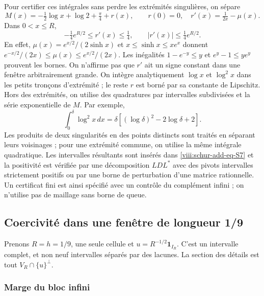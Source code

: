 Pour certifier ces intégrales sans perdre les extrémités singulières,
on sépare
\begin{equation}
M(x)=-\tfrac12\log x+\log2+\tfrac\pi4+r(x),
\qquad r(0)=0,\quad r'(x)=\tfrac1{2x}-\mu(x).
\label{viii:schur-add-eq-S8}
\end{equation}
Dans \(0<x\leq R\),
\begin{equation}
-\tfrac14 e^{R/2}\leq r'(x)\leq\tfrac14,
\qquad |r'(x)|\leq\tfrac14e^{R/2}.
\label{viii:schur-add-display-19}
\end{equation}
En effet, \(\mu(x)=e^{x/2}/(2\sinh x)\) et
\(x\leq\sinh x\leq xe^x\) donnent
\(e^{-x/2}/(2x)\leq\mu(x)\leq e^{x/2}/(2x)\).
Les inégalités \(1-e^{-y}\leq y\) et \(e^y-1\leq ye^y\)
prouvent les bornes. On n'affirme pas que \(r'\) ait un signe constant
dans une fenêtre arbitrairement grande.
On intègre analytiquement \(\log x\) et \(\log^2x\) dans les petits
tronçons d'extrémité ; le reste \(r\) est borné par sa constante de Lipschitz.
Hors des extrémités, on utilise des quadratures par intervalles subdivisées et
la série exponentielle de \(M\). Par exemple,
\begin{equation}
\int_0^\delta\log^2x\,dx
=\delta[(\log\delta)^2-2\log\delta+2].
\label{viii:schur-add-display-20}
\end{equation}
Les produits de deux singularités en des points distincts sont traités
en séparant leurs voisinages ; pour une extrémité commune, on utilise la même
intégrale quadratique. Les intervalles résultants sont insérés dans \eqref{viii:schur-add-eq-S7} et
la positivité est vérifiée par une décomposition \(LDL^*\) avec
des pivots intervalles strictement positifs ou par une borne de perturbation
d'une matrice rationnelle. Un certificat fini est ainsi spécifié
avec un contrôle du complément infini ; on n'utilise pas de maillage sans borne de queue.

\subsection{Coercivité dans une fenêtre de longueur 1/9}
\label{viii:schur-add-sub-248}

Prenons \(R=h=1/9\), une seule cellule et \(u=R^{-1/2}\mathbf1_{I_R}\). C'est un intervalle complet, et non neuf intervalles séparés par des lacunes. La section des détails est tout \(V_R\cap\{u\}^{\perp}\).

\subsubsection{Marge du bloc infini}
\label{viii:schur-add-sub-254}

